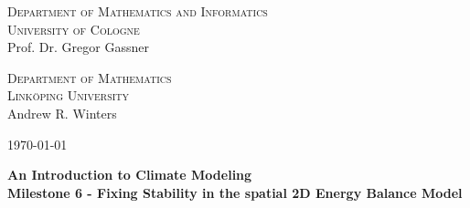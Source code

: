 \documentclass[10pt]{scrartcl}
\begin{document}
\begin{minipage}{.5\textwidth}
{\scshape Department of Mathematics and Informatics \\
University of Cologne\\}
\small Prof. Dr. Gregor Gassner \\
\end{minipage}
\begin{minipage}{.3\textwidth}
{\scshape Department of Mathematics \\
Link\"{o}ping University\\}
\small Andrew R. Winters \\
\end{minipage}
\hfill
\begin{minipage}{.15\textwidth}
\begin{flushright}
\today
\end{flushright}
\end{minipage}

\begin{center}
{\Large\bfseries
An Introduction to Climate Modeling}\\
\vspace{0.2cm}
{\bfseries Milestone 6 - Fixing Stability in the spatial 2D Energy Balance Model}
\end{center}
\end{document}
